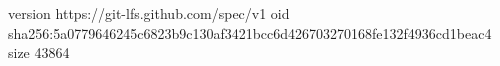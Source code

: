 version https://git-lfs.github.com/spec/v1
oid sha256:5a0779646245c6823b9c130af3421bcc6d426703270168fe132f4936cd1beac4
size 43864
